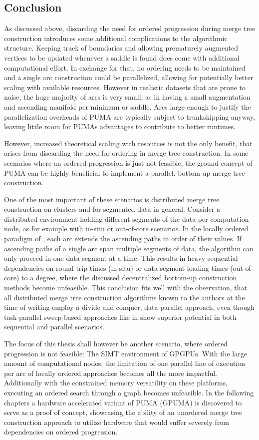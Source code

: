 \documentclass{scrartcl}
\begin{document}
\subsection{Conclusion}
As discussed above, discarding the need for ordered progression during merge tree construction introduces some additional complications to the algorithmic structure. Keeping track of boundaries and allowing prematurely augmented vertices to be updated whenever a saddle is found does come with additional computational effort. In exchange for that, no ordering needs to be maintained and a single arc construction could be parallelized, allowing for potentially better scaling with available resources. However in realistic datasets that are prone to noise, the huge majority of arcs is very small, as in having a small augmentation and ascending manifold per minimum or saddle. Arcs large enough to justify the parallelization overheads of PUMA are typically subject to trunkskipping anyway, leaving little room for PUMAs advantages to contribute to better runtimes. 

However, increased theoretical scaling with resources is not the only benefit, that arises from discarding the need for ordering in merge tree construction. In some scenarios where an ordered progression is just not feasible, the ground concept of PUMA can be highly beneficial to implement a parallel, bottom up merge tree construction. 

One of the most important of these scenarios is distributed merge tree construction on clusters and for segmented data in general. Consider a distributed environment holding different segments of the data per computation node, as for example with in-situ or out-of-core scenarios. In the locally ordered paradigm of \cite{FTM}, each arc extends the ascending paths in order of their values. If ascending paths of a single arc span multiple segments of data, the algorithm can only proceed in one data segment at a time. This results in heavy sequential dependencies on round-trip times (in-situ) or data segment loading times (out-of-core) to a degree, where the discussed decentralized bottom-up construction methods become unfeasible. This conclusion fits well with the observation, that all distributed merge tree construction algorithms known to the authors at the time of writing employ a divide and conquer, data-parallel approach, even though task-parallel sweep-based approaches like in \cite{FTM} show superior potential in both sequential and parallel scenarios. 

The focus of this thesis shall however be another scenario, where ordered progression is not feasible: The SIMT environment of GPGPUs. With the large amount of computational nodes, the limitation of one parallel line of execution per arc of locally ordered approaches becomes all the more impactful. Additionally with the constrained memory versatility on these platforms, executing an ordered search through a graph becomes unfeasible. In the following chapters a hardware accelerated variant of PUMA (GPUMA) is discovered to serve as a proof of concept, showcasing the ability of an unordered merge tree construction approach to utilize hardware that would suffer severely from dependencies on ordered progression. 
\end{document}
